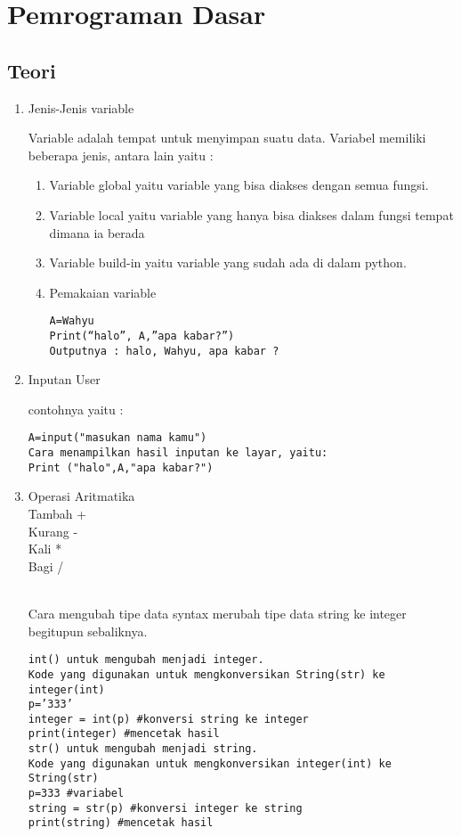\chapter{Pemrograman Dasar}

\section{Teori}

\begin{enumerate}
\item Jenis-Jenis variable

\par Variable adalah tempat untuk menyimpan suatu data. Variabel memiliki beberapa jenis, antara lain yaitu :
\begin{enumerate}
\item Variable global yaitu variable yang bisa diakses dengan semua fungsi.
\item Variable local yaitu variable yang hanya bisa diakses dalam fungsi tempat dimana ia berada
\item Variable build-in yaitu variable yang sudah ada di dalam python.
\item Pemakaian variable

\begin{verbatim}
A=Wahyu
Print(“halo”, A,”apa kabar?”)
Outputnya : halo, Wahyu, apa kabar ?

\end{verbatim}
\end{enumerate}

\item Inputan User
\par contohnya yaitu :
\begin{verbatim}
A=input("masukan nama kamu")
Cara menampilkan hasil inputan ke layar, yaitu:
Print ("halo",A,"apa kabar?")

\end{verbatim}

\item Operasi Aritmatika\\
Tambah		+ \\
Kurang		- \\
Kali		* \\
Bagi		/ \\
\\
\par Cara mengubah tipe data syntax merubah tipe data string ke integer begitupun sebaliknya.

\begin{verbatim}
int() untuk mengubah menjadi integer.
Kode yang digunakan untuk mengkonversikan String(str) ke integer(int)
p=’333’
integer = int(p) #konversi string ke integer
print(integer) #mencetak hasil
str() untuk mengubah menjadi string.
Kode yang digunakan untuk mengkonversikan integer(int) ke String(str)
p=333 #variabel 
string = str(p) #konversi integer ke string 
print(string) #mencetak hasil 


\end{verbatim}
\end{enumerate}
